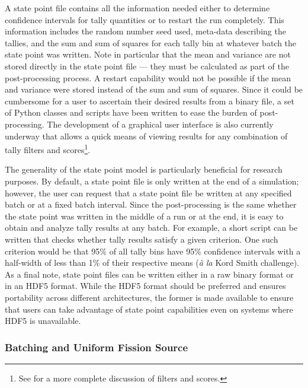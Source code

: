 \documentclass{ansconf}
\begin{document}
A state point file contains all the information needed either to determine
confidence intervals for tally quantities or to restart the run completely. This
information includes the random number seed used, meta-data describing the
tallies, and the sum and sum of squares for each tally bin at whatever batch the
state point was written. Note in particular that the mean and variance are not
stored directly in the state point file --- they must be calculated as part of
the post-processing process. A restart capability would not be possible if the
mean and variance were stored instead of the sum and sum of squares. Since it
could be cumbersome for a user to ascertain their desired results from a binary
file, a set of Python classes and scripts have been written to ease the burden
of post-processing. The development of a graphical user interface is also
currently underway that allows a quick means of viewing results for any
combination of tally filters and scores\footnote{See \cite{ane-romano-2013} for
  a more complete discussion of filters and scores.}.

The generality of the state point model is particularly beneficial for research
purposes. By default, a state point file is only written at the end of a
simulation; however, the user can request that a state point file be written at
any specified batch or at a fixed batch interval. Since the post-processing is
the same whether the state point was written in the middle of a run or at the
end, it is easy to obtain and analyze tally results at any batch. For example, a
short script can be written that checks whether tally results satisfy a given
criterion. One such criterion would be that 95\% of all tally bins have 95\%
confidence intervals with a half-width of less than 1\% of their respective
means (\emph{à la} Kord Smith challenge). As a final note, state point files can
be written either in a raw binary format or in an HDF5 format. While the HDF5
format should be preferred and ensures portability across different
architectures, the former is made available to ensure that users can take
advantage of state point capabilities even on systems where HDF5 is unavailable.

\subsubsection{Batching and Uniform Fission Source}
\end{document}
